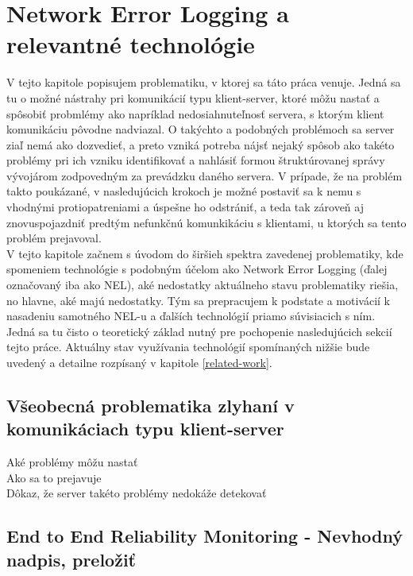 \chapter{Network Error Logging a relevantné technológie}
\label{nel-and-related-technologies}


V tejto kapitole popisujem problematiku, v ktorej sa táto práca venuje. Jedná sa tu o možné nástrahy pri komunikácií typu klient-server,
ktoré môžu nastať a spôsobiť probmlémy ako napríklad nedosiahnuteľnosť servera, s ktorým klient komunikáciu pôvodne nadviazal.
O takýchto a podobných problémoch sa server ziaľ nemá ako dozvedieť, a preto vzniká potreba nájsť nejaký spôsob ako takéto problémy pri ich
vzniku identifikovať a nahlásiť formou štruktúrovanej správy vývojárom zodpovedným za prevádzku daného servera. V prípade, že 
na problém takto poukázané, v nasledujúcich krokoch je možné postaviť sa k nemu s vhodnými protiopatreniami a úspešne ho odstrániť, a teda 
tak zároveň aj znovuspojazdniť predtým nefunkčnú komunkikáciu s klientami, u ktorých sa tento problém prejavoval.
\\
V tejto kapitole začnem s úvodom do širšieh spektra zavedenej problematiky, kde spomeniem technológie s podobným účelom 
ako Network Error Logging (ďalej označovaný iba ako NEL), aké nedostatky aktuálneho stavu problematiky riešia, no hlavne, aké majú nedostatky. 
Tým sa prepracujem k podstate a motivácií k nasadeniu samotného NEL-u a ďalších technológií priamo súvisiacich s ním. 
Jedná sa tu čisto o teoretický základ nutný pre pochopenie nasledujúcich sekcií tejto práce. 
Aktuálny stav využívania technológií spomínaných nižšie bude uvedený a detailne rozpísaný v kapitole \ref{related-work}.

\section{Všeobecná problematika zlyhaní v komunikáciach typu klient-server}

Aké problémy môžu nastať
\\
Ako sa to prejavuje
\\
Dôkaz, že server takéto problémy nedokáže detekovať

\section{End to End Reliability Monitoring - Nevhodný nadpis, preložiť}

